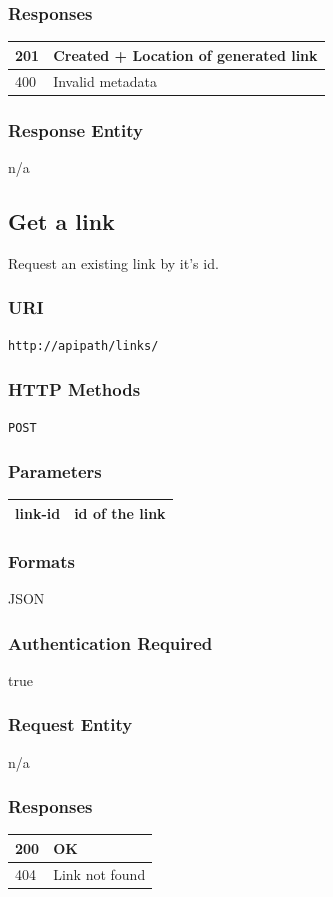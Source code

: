 \documentclass[10pt]{article}
\begin{document}
\subsubsection{Responses}
\begin{tabular}{|l|l|}\hline
201 & Created + Location of generated link  \\
\hline
400 & Invalid metadata \\
\hline
\end{tabular}
\subsubsection{Response Entity}
n/a
\subsection{Get a link}
Request an existing link by it's id.
\subsubsection{URI}
\texttt{http://apipath/links/
}\subsubsection{HTTP Methods}
\texttt{POST}
\subsubsection{Parameters}
\begin{tabular}{|l|l|}\hline
link-id & id of the link \\
\hline
\end{tabular}
\subsubsection{Formats}
JSON
\subsubsection{Authentication Required}
true
\subsubsection{Request Entity}
n/a
\subsubsection{Responses}
\begin{tabular}{|l|l|}\hline
200 & OK \\
\hline
404 & Link not found \\
\hline
\end{tabular}
\end{document}
